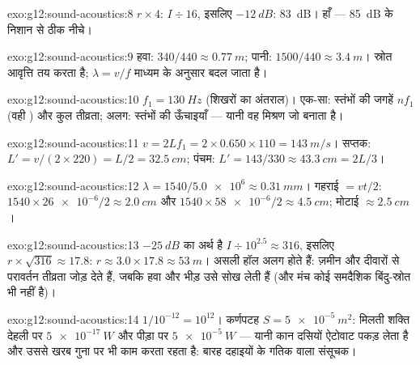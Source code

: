 \begin{solution}{exo:g12:sound-acoustics:8}
$r \times 4$: $I \div 16$, इसलिए $-\qty{12}{dB}$: \qty{83}{dB}। हाँ --- \qty{85}{dB} के निशान से ठीक नीचे।
\end{solution}

\begin{solution}{exo:g12:sound-acoustics:9}
हवा: $340/440 \approx \qty{0.77}{m}$; पानी: $1500/440 \approx
\qty{3.4}{m}$। स्रोत आवृत्ति तय करता है;
 $\lambda = v/f$ माध्यम के अनुसार बदल जाता है।
\end{solution}

\begin{solution}{exo:g12:sound-acoustics:10}
$f_1 = \qty{130}{Hz}$ (शिखरों का अंतराल)। एक-सा: स्तंभों की जगहें $nf_1$ (वही
) और कुल तीव्रता; अलग: स्तंभों की ऊँचाइयाँ --- यानी वह मिश्रण
जो  बनाता है।
\end{solution}

\begin{solution}{exo:g12:sound-acoustics:11}
$v = 2Lf_1 = 2 \times 0.650 \times 110 = \qty{143}{m/s}$। सप्तक: $L' = v/(2 \times 220) = L/2 = \qty{32.5}{cm}$; पंचम: $L' = 143/330 \approx \qty{43.3}{cm} = 2L/3$।
\end{solution}

\begin{solution}{exo:g12:sound-acoustics:12}
$\lambda = 1540/\num{5.0e6} \approx \qty{0.31}{mm}$। गहराई $= vt/2$: $1540 \times \num{26e-6}/2 \approx \qty{2.0}{cm}$ और $1540 \times \num{58e-6}/2 \approx \qty{4.5}{cm}$; मोटाई $\approx \qty{2.5}{cm}$।
\end{solution}

\begin{solution}{exo:g12:sound-acoustics:13}
$-\qty{25}{dB}$ का अर्थ है $I \div 10^{2.5} \approx 316$, इसलिए $r \times \sqrt{316} \approx 17.8$: $r \approx 3.0 \times 17.8
\approx \qty{53}{m}$। असली हॉल अलग होते हैं:
ज़मीन और दीवारों से परावर्तन तीव्रता जोड़ देते हैं, जबकि हवा और भीड़ उसे सोख
लेती हैं (और मंच कोई समदैशिक बिंदु-स्रोत भी नहीं है)।
\end{solution}

\begin{solution}{exo:g12:sound-acoustics:14}
$1/10^{-12} = 10^{12}$। कर्णपटह $S = \qty{5e-5}{m^2}$: मिलती शक्ति देहली पर $\qty{5e-17}{W}$ और पीड़ा पर
$\qty{5e-5}{W}$ --- यानी कान दसियों ऐटोवाट पकड़ लेता है और उससे खरब गुना पर भी काम
करता रहता है: बारह दहाइयों के गतिक  वाला संसूचक।
\end{solution}

